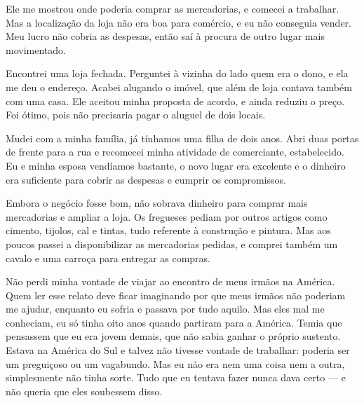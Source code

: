 Ele me mostrou onde poderia comprar as mercadorias, e comecei a trabalhar. 
Mas a localização da loja não era
boa para comércio, e eu não conseguia vender. Meu lucro não cobria as despesas, 
então saí à procura de outro lugar mais movimentado.

Encontrei uma loja fechada. Perguntei à vizinha do lado quem era o dono, e ela me deu o 
endereço. Acabei alugando o imóvel, que além de loja contava também com uma casa. Ele aceitou minha 
proposta de acordo, e ainda reduziu o preço. Foi ótimo, pois não precisaria pagar o aluguel de dois locais. 

Mudei com a minha família, já tínhamos uma filha de dois anos. Abri
duas portas de frente para a rua e recomecei minha atividade de
comerciante, estabelecido. Eu e minha esposa vendíamos bastante,
o novo lugar era excelente e o dinheiro era suficiente
para cobrir as despesas e cumprir os compromissos.

Embora o negócio fosse bom, não sobrava dinheiro para comprar mais
mercadorias e ampliar a loja. Os fregueses pediam por outros artigos como 
cimento, tijolos, cal e tintas, tudo referente à construção e
pintura. Mas aos poucos passei a disponibilizar as mercadorias pedidas, e
comprei também um cavalo e uma carroça para entregar as compras.


Não perdi minha vontade de viajar ao encontro de meus irmãos
na América. Quem ler esse relato deve ficar imaginando por que meus irmãos não
poderiam me ajudar, enquanto eu sofria e passava por tudo aquilo. 
Mas eles mal me conheciam, eu só tinha oito anos quando partiram para a América. 
Temia que pensassem que eu era jovem demais, que não sabia ganhar o próprio sustento. 
Estava na América do Sul e talvez não tivesse vontade de
trabalhar: poderia ser um preguiçoso ou um vagabundo. Mas eu não era nem uma coisa
nem a outra, simplesmente não tinha sorte. Tudo que eu tentava fazer
nunca dava certo --- e não queria que eles soubessem disso.


